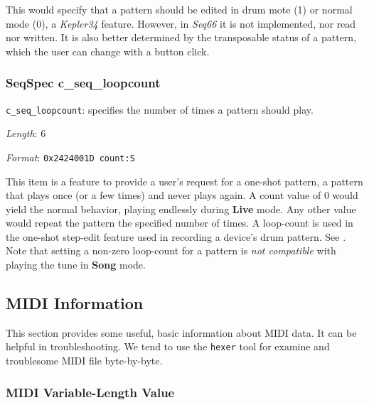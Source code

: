    This would specify that a pattern should be edited in drum
   mote (1) or normal mode (0), a \textsl{Kepler34} feature.
   However, in \textsl{Seq66} it is not implemented, nor read nor written.
   It is also better determined by the transposable status of a pattern,
   which the user can change with a button click.

\subsubsection{SeqSpec c\_seq\_loopcount}
\label{subsubsec:midi_format_track_seqspec_seq_loopcount}

   \begin{description}
      \item \texttt{c\_seq\_loopcount}:
         specifies the number of times a pattern should play.
      \item \textsl{Length}: 6
      \item \textsl{Format}: \texttt{0x2424001D count:S}
   \end{description}

   This item is a feature to provide a user's request for a one-shot
   pattern, a pattern that plays once (or a few times)
   and never plays again.  A count value of 0 would yield
   the normal behavior, playing endlessly during \textbf{Live} mode.
   Any other value would repeat the pattern the specified number of times.
   A loop-count is used in the one-shot step-edit feature used in
   recording a device's drum pattern.
   See .
   Note that setting a non-zero loop-count for a pattern is
   \textsl{not compatible} with playing the tune in \textbf{Song} mode.

\subsection{MIDI Information}
\label{subsec:midi_information}

   This section provides some useful, basic information about MIDI data.
   It can be helpful in troubleshooting.  We tend to use the
   \texttt{hexer} tool for examine and troublesome MIDI file byte-by-byte.

\subsubsection{MIDI Variable-Length Value}
\label{subsubsec:midi_variable_length_value}

